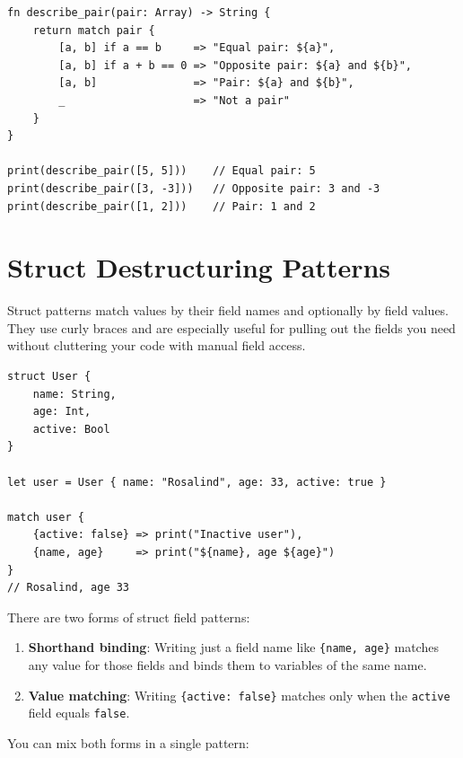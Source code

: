 \begin{lstlisting}[language=Lattice, caption={Array patterns with guards}]
fn describe_pair(pair: Array) -> String {
    return match pair {
        [a, b] if a == b     => "Equal pair: ${a}",
        [a, b] if a + b == 0 => "Opposite pair: ${a} and ${b}",
        [a, b]               => "Pair: ${a} and ${b}",
        _                    => "Not a pair"
    }
}

print(describe_pair([5, 5]))    // Equal pair: 5
print(describe_pair([3, -3]))   // Opposite pair: 3 and -3
print(describe_pair([1, 2]))    // Pair: 1 and 2
\end{lstlisting}

\section{Struct Destructuring Patterns}\label{sec:struct-patterns}

Struct patterns match values by their field names and optionally by field values. They use curly braces and are especially useful for pulling out the fields you need without cluttering your code with manual field access.

\begin{lstlisting}[language=Lattice, caption={Basic struct destructuring}]
struct User {
    name: String,
    age: Int,
    active: Bool
}

let user = User { name: "Rosalind", age: 33, active: true }

match user {
    {active: false} => print("Inactive user"),
    {name, age}     => print("${name}, age ${age}")
}
// Rosalind, age 33
\end{lstlisting}

There are two forms of struct field patterns:

\begin{enumerate}
  \item \textbf{Shorthand binding}: Writing just a field name like \lstinline|{name, age}| matches any value for those fields and binds them to variables of the same name.
  \item \textbf{Value matching}: Writing \lstinline|{active: false}| matches only when the \lstinline|active| field equals \lstinline|false|.
\end{enumerate}

You can mix both forms in a single pattern:

